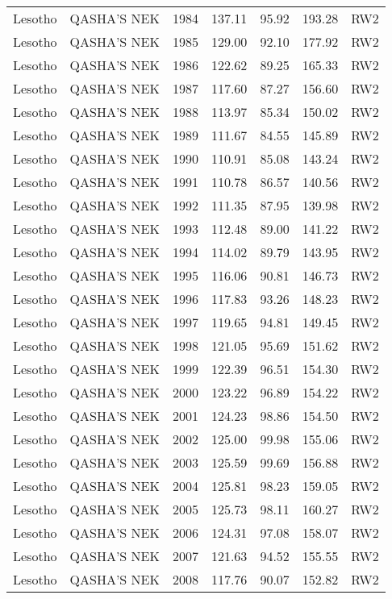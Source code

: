 \begin{longtable}{lllrrrl}
  Lesotho & QASHA'S NEK & 1984 & 137.11 & 95.92 & 193.28 & RW2 \\ 
  Lesotho & QASHA'S NEK & 1985 & 129.00 & 92.10 & 177.92 & RW2 \\ 
  Lesotho & QASHA'S NEK & 1986 & 122.62 & 89.25 & 165.33 & RW2 \\ 
  Lesotho & QASHA'S NEK & 1987 & 117.60 & 87.27 & 156.60 & RW2 \\ 
  Lesotho & QASHA'S NEK & 1988 & 113.97 & 85.34 & 150.02 & RW2 \\ 
  Lesotho & QASHA'S NEK & 1989 & 111.67 & 84.55 & 145.89 & RW2 \\ 
  Lesotho & QASHA'S NEK & 1990 & 110.91 & 85.08 & 143.24 & RW2 \\ 
  Lesotho & QASHA'S NEK & 1991 & 110.78 & 86.57 & 140.56 & RW2 \\ 
  Lesotho & QASHA'S NEK & 1992 & 111.35 & 87.95 & 139.98 & RW2 \\ 
  Lesotho & QASHA'S NEK & 1993 & 112.48 & 89.00 & 141.22 & RW2 \\ 
  Lesotho & QASHA'S NEK & 1994 & 114.02 & 89.79 & 143.95 & RW2 \\ 
  Lesotho & QASHA'S NEK & 1995 & 116.06 & 90.81 & 146.73 & RW2 \\ 
  Lesotho & QASHA'S NEK & 1996 & 117.83 & 93.26 & 148.23 & RW2 \\ 
  Lesotho & QASHA'S NEK & 1997 & 119.65 & 94.81 & 149.45 & RW2 \\ 
  Lesotho & QASHA'S NEK & 1998 & 121.05 & 95.69 & 151.62 & RW2 \\ 
  Lesotho & QASHA'S NEK & 1999 & 122.39 & 96.51 & 154.30 & RW2 \\ 
  Lesotho & QASHA'S NEK & 2000 & 123.22 & 96.89 & 154.22 & RW2 \\ 
  Lesotho & QASHA'S NEK & 2001 & 124.23 & 98.86 & 154.50 & RW2 \\ 
  Lesotho & QASHA'S NEK & 2002 & 125.00 & 99.98 & 155.06 & RW2 \\ 
  Lesotho & QASHA'S NEK & 2003 & 125.59 & 99.69 & 156.88 & RW2 \\ 
  Lesotho & QASHA'S NEK & 2004 & 125.81 & 98.23 & 159.05 & RW2 \\ 
  Lesotho & QASHA'S NEK & 2005 & 125.73 & 98.11 & 160.27 & RW2 \\ 
  Lesotho & QASHA'S NEK & 2006 & 124.31 & 97.08 & 158.07 & RW2 \\ 
  Lesotho & QASHA'S NEK & 2007 & 121.63 & 94.52 & 155.55 & RW2 \\ 
  Lesotho & QASHA'S NEK & 2008 & 117.76 & 90.07 & 152.82 & RW2 \\ 

\end{longtable}
